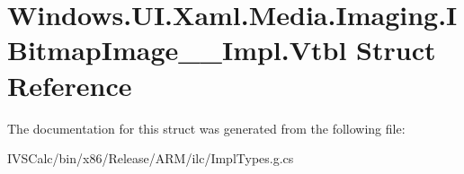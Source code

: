 \hypertarget{struct_windows_1_1_u_i_1_1_xaml_1_1_media_1_1_imaging_1_1_i_bitmap_image_____impl_1_1_vtbl}{}\section{Windows.\+U\+I.\+Xaml.\+Media.\+Imaging.\+I\+Bitmap\+Image\+\_\+\+\_\+\+Impl.\+Vtbl Struct Reference}
\label{struct_windows_1_1_u_i_1_1_xaml_1_1_media_1_1_imaging_1_1_i_bitmap_image_____impl_1_1_vtbl}


The documentation for this struct was generated from the following file\+:\begin{DoxyCompactItemize}
\item 
I\+V\+S\+Calc/bin/x86/\+Release/\+A\+R\+M/ilc/Impl\+Types.\+g.\+cs\end{DoxyCompactItemize}
